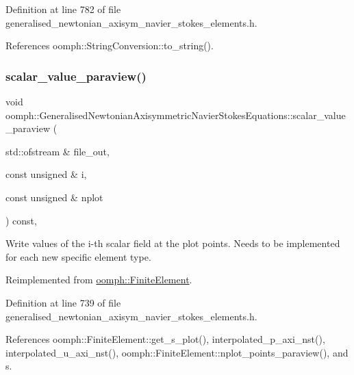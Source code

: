 Definition at line 782 of file generalised\+\_\+newtonian\+\_\+axisym\+\_\+navier\+\_\+stokes\+\_\+elements.\+h.



References oomph\+::\+String\+Conversion\+::to\+\_\+string().

\mbox{\label{classoomph_1_1GeneralisedNewtonianAxisymmetricNavierStokesEquations_ad5f147e84ac4a3cdd4caf9e96d927661}} 
\subsubsection{\texorpdfstring{scalar\+\_\+value\+\_\+paraview()}{scalar\_value\_paraview()}}
{\footnotesize\ttfamily void oomph\+::\+Generalised\+Newtonian\+Axisymmetric\+Navier\+Stokes\+Equations\+::scalar\+\_\+value\+\_\+paraview (\begin{DoxyParamCaption}\item[{std\+::ofstream \&}]{file\+\_\+out,  }\item[{const unsigned \&}]{i,  }\item[{const unsigned \&}]{nplot }\end{DoxyParamCaption}) const\hspace{0.3cm}{\ttfamily [inline]}, {\ttfamily [virtual]}}



Write values of the i-\/th scalar field at the plot points. Needs to be implemented for each new specific element type. 



Reimplemented from \hyperlink{classoomph_1_1FiniteElement_a02cf8832a5e2886f1572bd36f7a7c1e3}{oomph\+::\+Finite\+Element}.



Definition at line 739 of file generalised\+\_\+newtonian\+\_\+axisym\+\_\+navier\+\_\+stokes\+\_\+elements.\+h.



References oomph\+::\+Finite\+Element\+::get\+\_\+s\+\_\+plot(), interpolated\+\_\+p\+\_\+axi\+\_\+nst(), interpolated\+\_\+u\+\_\+axi\+\_\+nst(), oomph\+::\+Finite\+Element\+::nplot\+\_\+points\+\_\+paraview(), and s.


